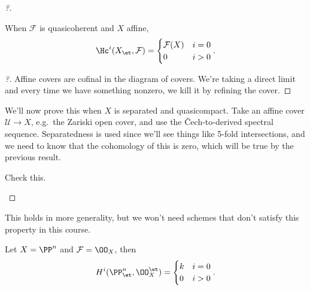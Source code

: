 \begin{proof}[?]
\begin{claim}[3]

When \(\mathcal{F}\) is quasicoherent and \(X\) affine,
\begin{align*}  
\Hc^i(X_\et, \mathcal{F}) = 
\begin{cases}
\mathcal{F}(X) & i = 0 \\
0              & i>0
\end{cases}
.\end{align*}

\end{claim}

\begin{proof}[?]

Affine covers are cofinal in the diagram of covers. We're taking a
direct limit and every time we have something nonzero, we kill it by
refining the cover.

\end{proof}

We'll now prove this when \(X\) is separated and quasicompact. Take an
affine cover \(\mathcal{U}\to X\), e.g.~the Zariski open cover, and use
the Čech-to-derived spectral sequence. Separatedness is used since we'll
see things like 5-fold intersections, and we need to know that the
cohomology of this is zero, which will be true by the previous result.

\begin{exercise}[?]

Check this.

\end{exercise}

\end{proof}

\begin{remark}

This holds in more generality, but we won't need schemes that don't
satisfy this property in this course.

\end{remark}

\begin{example}[?]

Let \(X = \PP^n\) and \(\mathcal{F} = \OO_X\), then
\begin{align*}  
H^i(\PP^n_\et, \OO_X^{\et}) = 
\begin{cases}
k & i= 0 \\
0 & i>0
\end{cases}
.\end{align*}

\end{example}

